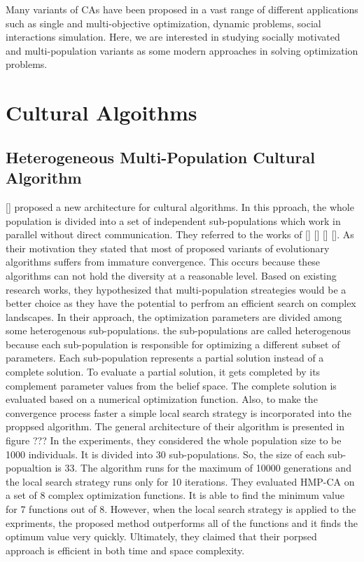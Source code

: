\label{chapter:problem}

\newlength{\savedunitlength}
\setlength{\unitlength}{2em}

Many variants of CAs have been proposed in a vast range of different applications such as single and multi-objective optimization, dynamic problems, social interactions simulation. Here, we are interested in studying socially motivated and multi-population variants as some modern approaches in solving optimization problems.
\section{Cultural Algoithms}
\subsection{Heterogeneous Multi-Population Cultural Algorithm}
[] proposed a new architecture for cultural algorithms. In this pproach, the whole population is divided into a set of independent sub-populations which work in parallel without direct communication. They referred to the works of [] [] [] []. As their motivation they stated that most of proposed variants of evolutionary algorithms suffers from immature convergence. This occurs because these algorithms can not hold the diversity at a reasonable level. Based on existing research works, they hypothesized that multi-population streategies would be a better choice as they have the potential to perfrom an efficient search on complex landscapes. In their approach, the optimization parameters are divided among some heterogenous sub-populations. the sub-populations are called heterogenous because each sub-population is responsible for optimizing a different subset of parameters. Each sub-population represents a partial solution instead of a complete solution. To evaluate a partial solution, it gets completed by its complement parameter values from the belief space. The complete solution is evaluated based on a numerical optimization function. Also, to make the convergence process faster a simple local search strategy is incorporated into the proppsed algorithm. The general architecture of their algorithm is presented in figure ???\newline
In the experiments, they considered the whole population size to be 1000 individuals. It is divided into 30 sub-populations. So, the size of each sub-popualtion is 33. The algorithm runs for the maximum of 10000 generations and the local search strategy runs only for 10 iterations. They evaluated HMP-CA on a set of 8 complex optimization functions. It is able to find the minimum value for 7 functions out of 8. However, when the local search strategy is applied to the expriments, the proposed method outperforms all of the functions and it finds the optimum value very quickly. Ultimately, they claimed that their porpsed approach is efficient in both time and space complexity.

